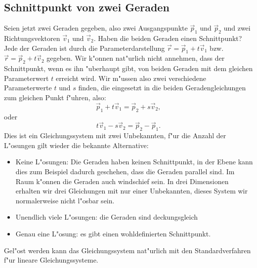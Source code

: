 \subsection{Schnittpunkt von zwei Geraden}
Seien jetzt zwei Geraden gegeben, also zwei Ausgangspunkte $\vec p_1$ und
$\vec p_2$ und zwei Richtungsvektoren $\vec v_1$ und $\vec v_2$.
Haben die beiden Geraden einen Schnittpunkt?
Jede der Geraden ist durch die Parameterdarstellung
$\vec r=\vec p_1+t\vec v_1$
bzw.~$\vec r=\vec p_2+t\vec v_2$
gegeben.
Wir k"onnen nat"urlich nicht annehmen, dass der Schnittpunkt,
wenn es ihn "uberhaupt gibt, von beiden Geraden mit dem gleichen Parameterwert
$t$ erreicht wird.
Wir m"ussen also zwei verschiedene Parameterwerte $t$
und $s$ finden, die eingesetzt in die beiden Geradengleichungen zum gleichen
Punkt f"uhren, also:
\[
\vec p_1+t\vec v_1=\vec p_2+s\vec v_2,
\]
oder
\[
t\vec v_1-s\vec v_2=\vec p_2-\vec p_1.
\]
Dies ist ein Gleichungssystem mit zwei Unbekannten, f"ur die Anzahl der L"osungen
gilt wieder die bekannte Alternative:
\begin{itemize}
\item Keine L"osungen: Die Geraden haben keinen Schnittpunkt, in der Ebene
kann dies zum Beispiel dadurch geschehen, dass die Geraden parallel sind.
Im Raum k"onnen die Geraden auch windschief sein.
In drei Dimensionen erhalten wir drei Gleichungen mit nur einer Unbekannten,
dieses System wir normalerweise nicht l"osbar sein.
\item Unendlich viele L"osungen: die Geraden sind deckungsgleich
\item Genau eine L"osung: es gibt einen wohldefinierten Schnittpunkt.
\end{itemize}
Gel"ost werden kann das Gleichungssystem nat"urlich mit den Standardverfahren
f"ur lineare Gleichungssysteme.


